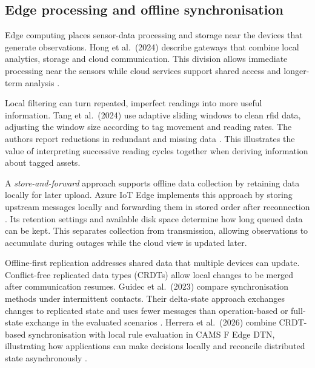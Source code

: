 \subsection{Edge processing and offline synchronisation}
\label{sec:edge-offline-synchronisation}


Edge computing places sensor-data processing and storage near the devices that generate observations. Hong et al.\ (2024) describe gateways that combine local analytics, storage and cloud communication. This division allows immediate processing near the sensors while cloud services support shared access and longer-term analysis \cite{hong2024iotedge}.

Local filtering can turn repeated, imperfect readings into more useful information. Tang et al.\ (2024) use adaptive sliding windows to clean \acrshort{rfid} data, adjusting the window size according to tag movement and reading rates. The authors report reductions in redundant and missing data \cite{tang2024edgecleaning}. This illustrates the value of interpreting successive reading cycles together when deriving information about tagged assets.

A \emph{store-and-forward} approach supports offline data collection by retaining data locally for later upload. Azure IoT Edge implements this approach by storing upstream messages locally and forwarding them in stored order after reconnection \cite{microsoftiotedgeoffline}. Its retention settings and available disk space determine how long queued data can be kept. This separates collection from transmission, allowing observations to accumulate during outages while the cloud view is updated later.

Offline-first replication addresses shared data that multiple devices can update. Conflict-free replicated data types (CRDTs) allow local changes to be merged after communication resumes. Guidec et al.\ (2023) compare synchronisation methods under intermittent contacts. Their delta-state approach exchanges changes to replicated state and uses fewer messages than operation-based or full-state exchange in the evaluated scenarios \cite{guidec2023opportunisticcrdt}. Herrera et al.\ (2026) combine CRDT-based synchronisation with local rule evaluation in CAMS F Edge DTN, illustrating how applications can make decisions locally and reconcile distributed state asynchronously \cite{herrera2026cams}.
